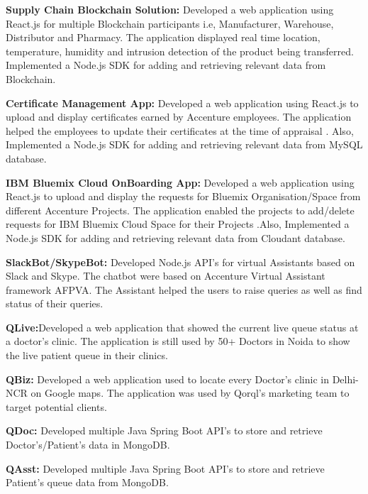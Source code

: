 \documentclass[letterpaper]{amir-resume} %
\begin{document}
\begin{minipage}[t]{0.66\textwidth}
\begin{tightitemize}
\item {\bf Supply Chain Blockchain Solution:}  \justifying Developed a web application using React.js for multiple Blockchain participants i.e, Manufacturer, Warehouse, Distributor and Pharmacy. The application displayed real time location, temperature, humidity and intrusion detection of the product being transferred. Implemented a Node.js SDK for adding and retrieving relevant data from Blockchain.
\item {\bf Certificate Management App: }   Developed a web application using React.js to upload and display certificates earned by Accenture employees. The application helped the employees to update their certificates at the time of appraisal . Also, Implemented a Node.js SDK for adding and retrieving relevant data from MySQL database.
\item {\bf IBM Bluemix Cloud OnBoarding App: }   Developed a web application using React.js to upload and display the requests for Bluemix Organisation/Space from different Accenture Projects. The application enabled the projects to add/delete requests for IBM Bluemix Cloud Space for their Projects .Also, Implemented a Node.js SDK for adding and retrieving relevant data from Cloudant database.
\item {\bf SlackBot/SkypeBot: }   Developed Node.js API's for virtual Assistants based on Slack and Skype. The chatbot were based on Accenture Virtual Assistant framework AFPVA. The Assistant helped the users to raise queries as well as  find status of their queries.
\end{tightitemize}

\sectionspace %



\begin{tightitemize}
\item {\bf QLive:}\justifying Developed a web application that showed the current live queue status at a doctor’s clinic. The application is still used by 50+ Doctors in Noida to show the live patient queue in their clinics.
\item {\bf QBiz: } Developed a web application used to locate every Doctor's clinic in Delhi-NCR on Google maps. The application was used by Qorql's marketing team to target potential clients.
\item {\bf QDoc: } Developed multiple Java Spring Boot API's to store and retrieve Doctor's/Patient's data in MongoDB.
\item {\bf QAsst: } Developed multiple Java Spring Boot API's to store and retrieve Patient's queue data from MongoDB.
\end{tightitemize}



\end{minipage} %
\end{document}
